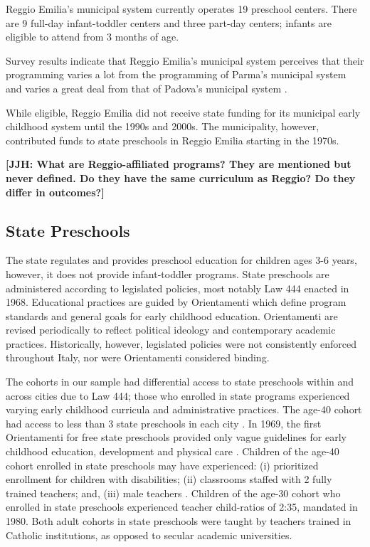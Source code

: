 Reggio Emilia's municipal system currently operates 19 preschool centers. There are 9 full-day infant-toddler centers and three part-day centers; infants are eligible to attend from 3 months of age.

Survey results indicate that Reggio Emilia's municipal system perceives that their programming varies a lot from the programming of Parma's municipal system and varies a great deal from that of Padova's municipal system \citep{CEHD_2016_Historical-Analysis}.

While eligible, Reggio Emilia did not receive state funding for its municipal early childhood system until the 1990s and 2000s. The municipality, however, contributed funds to state preschools in Reggio Emilia starting in the 1970s.

\textbf{[JJH: What are Reggio-affiliated programs? They are mentioned but never defined. Do they have the same curriculum as Reggio? Do they differ in outcomes?]}

\subsection{State Preschools}

The state regulates and provides preschool education for children ages 3-6 years, however, it does not provide infant-toddler programs. State preschools are administered according to legislated policies, most notably Law 444 enacted in 1968. Educational practices are guided by Orientamenti which define program standards and general goals for early childhood education. Orientamenti are revised periodically to reflect political ideology and contemporary academic practices. Historically, however, legislated policies were not consistently enforced throughout Italy, nor were Orientamenti considered binding.

The cohorts in our sample had differential access to state preschools within and across cities due to Law 444; those who enrolled in state programs experienced varying early childhood curricula and administrative practices. The age-40 cohort had access to less than 3 state preschools in each city \citep{Reggio-Admin-data_1966-2006,Reggio-Annual-Journals_1994-2011,Padova-Admin-Data_1964-2011}. In 1969, the first Orientamenti for free state preschools provided only vague guidelines for early childhood education, development and physical care \citep{Corsaro_1996_Early-Edu,Hohnerlein_2015_Development-and-Diffusion}. Children of the age-40 cohort enrolled in state preschools may have experienced: (i) prioritized enrollment for children with disabilities; (ii) classrooms staffed with 2 fully trained teachers; and, (iii) male teachers \citep{Hohnerlein_2015_Development-and-Diffusion}. Children of the age-30 cohort who enrolled in state preschools experienced teacher child-ratios of 2:35, mandated in 1980. Both adult cohorts in state preschools were taught by teachers trained in Catholic institutions, as opposed to secular academic universities.

